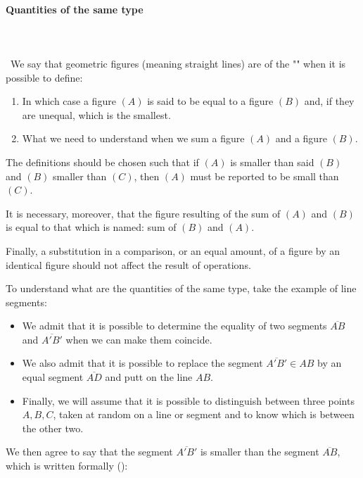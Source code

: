 	\pagebreak
	\paragraph{Quantities of the same type}\mbox{}\\\\\
	We say that geometric figures (meaning straight lines) are of the "" when it is possible to define:
	\begin{enumerate}
		\item In which case a figure $(A)$ is said to be equal to a figure $(B)$ and, if they are unequal, which is the smallest.
		
		\item What we need to understand when we sum a figure $(A)$ and a figure $(B)$.
	\end{enumerate}
	The definitions should be chosen such that if $(A)$ is smaller than said $(B)$ and $(B)$ smaller than $(C)$, then $(A)$ must be reported to be small than $(C)$.
	
	It is necessary, moreover, that the figure resulting of the sum of $(A)$ and $(B)$ is equal to that which is named: sum of $(B)$ and $(A)$.
	
	Finally, a substitution in a comparison, or an equal amount, of a figure by an identical figure should not affect the result of operations.
	
	To understand what are the quantities of the same type, take the example of line segments:
	\begin{itemize}
		\item We admit that it is possible to determine the equality of two segments $\overline{AB}$ and $\overline{A'B'}$ when we can make them coincide.
		
		\item We also admit that it is possible to replace the segment $\overline{A'B'} \in AB$ by an equal segment $\overline{AD}$ and putt on the line $AB$.
		
		\item Finally, we will assume that it is possible to distinguish between three points $A, B, C$, taken at random on a line or segment and to know which is between the other two.
	\end{itemize}
	
	We then agree to say that the segment $\overline{A'B'}$ is smaller than the segment $\overline{AB}$, which is written formally 
(\SeeChapter{see section Operators page \pageref{comparators}}):
	

